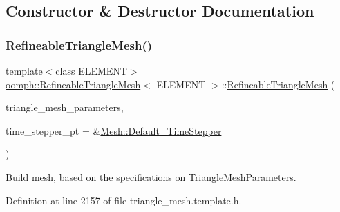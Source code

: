 \subsection{Constructor \& Destructor Documentation}
\mbox{\label{classoomph_1_1RefineableTriangleMesh_a8285dea563df94b4e450e283088da6d6}} 
\subsubsection{\texorpdfstring{Refineable\+Triangle\+Mesh()}{RefineableTriangleMesh()}\hspace{0.1cm}{\footnotesize\ttfamily [1/3]}}
{\footnotesize\ttfamily template$<$class E\+L\+E\+M\+E\+NT$>$ \\
\hyperlink{classoomph_1_1RefineableTriangleMesh}{oomph\+::\+Refineable\+Triangle\+Mesh}$<$ E\+L\+E\+M\+E\+NT $>$\+::\hyperlink{classoomph_1_1RefineableTriangleMesh}{Refineable\+Triangle\+Mesh} (\begin{DoxyParamCaption}\item[{\hyperlink{classoomph_1_1TriangleMeshParameters}{Triangle\+Mesh\+Parameters} \&}]{triangle\+\_\+mesh\+\_\+parameters,  }\item[{\hyperlink{classoomph_1_1TimeStepper}{Time\+Stepper} $\ast$}]{time\+\_\+stepper\+\_\+pt = {\ttfamily \&\hyperlink{classoomph_1_1Mesh_a12243d0fee2b1fcee729ee5a4777ea10}{Mesh\+::\+Default\+\_\+\+Time\+Stepper}} }\end{DoxyParamCaption})\hspace{0.3cm}{\ttfamily [inline]}}



Build mesh, based on the specifications on \hyperlink{classoomph_1_1TriangleMeshParameters}{Triangle\+Mesh\+Parameters}. 



Definition at line 2157 of file triangle\+\_\+mesh.\+template.\+h.

\mbox{\label{classoomph_1_1RefineableTriangleMesh_a72c24c96f89006c905551b650db29cc7}} 
